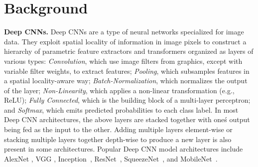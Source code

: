 \section{Background}

\vspace{2mm}
\noindent \textbf{Deep CNNs.} Deep CNNs are a type of neural networks specialized for image data.
They exploit spatial locality of information in image pixels to construct a hierarchy of parametric feature extractors and transformers organized as layers of various types: \textit{Convolution}, which use image
filters from graphics, except with variable filter weights, to extract features; \textit{Pooling}, which subsamples features in a spatial
locality-aware way; \textit{Batch-Normalization}, which normalizes the output of the layer; \textit{Non-Linearity}, which applies a non-linear transformation (e.g., ReLU); \textit{Fully Connected}, which is the building block of a multi-layer perceptron; and \textit{Softmax}, which emits predicted probabilities to each class label.
In most Deep CNN architectures, the above layers are stacked together with one\'s output being fed as the input to the other.
Adding multiple layers element-wise or stacking multiple layers together depth-wise to produce a new layer is also present in some architectures.
Popular Deep CNN model architectures include AlexNet \cite{alexnet}, VGG \cite{vggnet}, Inception~\cite{inception}, ResNet~\cite{resnet}, SqueezeNet~\cite{squeezenet}, and MobileNet~\cite{mobilenets}.

